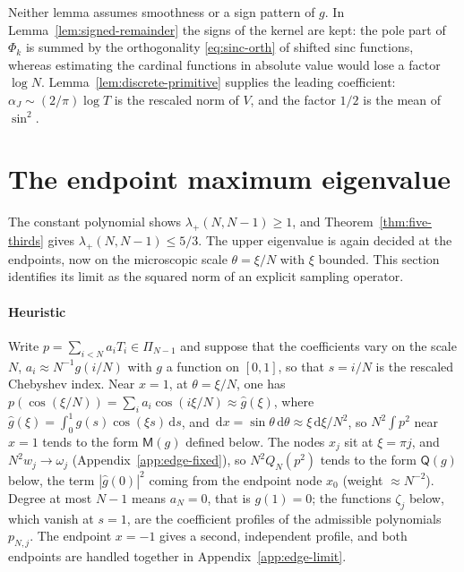 \documentclass{siamart251216}
\newcommand{\Pn}{\Pi}
\newcommand{\dd}{\,\mathrm d}
\begin{document}
Neither lemma assumes smoothness or a sign pattern of $g$. In
Lemma~\ref{lem:signed-remainder} the signs of the kernel are kept: the pole
part of $\Phi_k$ is summed by the orthogonality \eqref{eq:sinc-orth} of
shifted sinc functions, whereas estimating the cardinal functions in absolute
value would lose a factor $\log N$. Lemma~\ref{lem:discrete-primitive}
supplies the leading coefficient: $\alpha_J\sim(2/\pi)\log T$ is the
rescaled norm of $V$, and the factor $1/2$ is the mean of $\sin^2$.

\section{The endpoint maximum eigenvalue}\label{sec:edge-max}

The constant polynomial shows $\lambda_+(N,N-1)\ge1$, and
Theorem~\ref{thm:five-thirds} gives $\lambda_+(N,N-1)\le5/3$. The upper
eigenvalue is again decided at the endpoints, now on the microscopic
scale $\theta=\xi/N$ with $\xi$ bounded. This section identifies its limit
as the squared norm of an explicit sampling operator.

\paragraph{Heuristic}
Write $p=\sum_{i<N}a_iT_i\in\Pn_{N-1}$ and suppose that the coefficients vary
on the scale $N$, $a_i\approx N^{-1}g(i/N)$ with $g$ a function on $[0,1]$, so
that $s=i/N$ is the rescaled Chebyshev index. Near $x=1$, at
$\theta=\xi/N$, one has
$p(\cos(\xi/N))=\sum_ia_i\cos(i\xi/N)\approx\widehat g(\xi)$, where
$\widehat g(\xi)=\int_0^1g(s)\cos(\xi s)\dd s$, and
$\dd x=\sin\theta\dd\theta\approx\xi\dd\xi/N^2$, so $N^2\int p^2$ near $x=1$
tends to the form $\mathsf M(g)$ defined below. The nodes $x_j$ sit at
$\xi=\pi j$, and $N^2w_j\to\omega_j$ (Appendix~\ref{app:edge-fixed}), so
$N^2Q_N(p^2)$ tends to the form $\mathsf Q(g)$ below, the term
$|\widehat g(0)|^2$ coming from the endpoint node $x_0$ (weight
$\approx N^{-2}$). Degree at most $N-1$ means $a_N=0$, that is $g(1)=0$; the
functions $\zeta_j$ below, which vanish at $s=1$, are the coefficient profiles
of the admissible polynomials $p_{N,j}$. The endpoint $x=-1$ gives a second,
independent profile, and both endpoints are handled together in
Appendix~\ref{app:edge-limit}.
\end{document}
